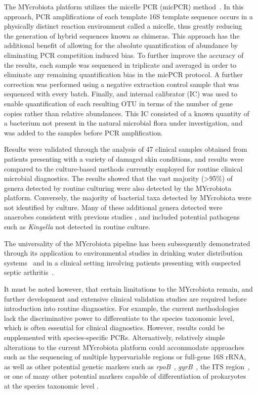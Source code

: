 The MYcrobiota platform utilizes the micelle PCR (micPCR) method~\cite{boers2015micelle,boers2017novel}. In this approach, PCR amplifications of each template 16S template sequence occurs in a physically distinct reaction environment called a micelle, thus greatly reducing the generation of hybrid sequences known as chimeras. This approach has the additional benefit of allowing for the absolute quantification of abundance by eliminating PCR competition induced bias. To further improve the accuracy of the results, each sample was sequenced in triplicate and averaged in order to eliminate any remaining quantification bias in the micPCR protocol. A further correction was performed using a negative extraction control sample that was sequenced with every batch. Finally, and internal calibrator (IC) was used to enable quantification of each resulting OTU in terms of the number of gene copies rather than relative abundances. This IC consisted of a known quantity of a bacterium not present in the natural microbial flora under investigation, and was added to the samples before PCR amplification.

Results were validated through the analysis of 47 clinical samples obtained from patients presenting with a variety of damaged skin conditions, and results were compared to the culture-based methods currently employed for routine clinical microbial diagnostics. The results showed that the vast majority (>95\%) of genera detected by routine culturing were also detected by the MYcrobiota platform. Conversely, the majority of bacterial taxa detected by MYcrobiota were not identified by culture. Many of these additional genera detected were anaerobes consistent with previous studies \cite{TODO}, and included potential pathogens such as \emph{Kingella} not detected in routine culture.

The universality of the MYcrobiota pipeline has been subsequently demonstrated through its application to environmental studies in drinking water distribution systems~\cite{boers2018monitoring} and in a clinical setting involving patients presenting with suspected septic arthritis~\cite{boers2018detection}.

It must be noted however, that certain limitations to the MYcrobiota remain, and further development and extensive clinical validation studies are required before introduction into routine diagnostics. For example, the current methodologies lack the discriminative power to differentiate to the species taxonomic level, which is often essential for clinical diagnostics. However, results could be supplemented with species-specific PCRs. Alternatively, relatively simple alterations to the current MYcrobiota platform could accommodate approaches such as the sequencing of multiple hypervariable regions or full-gene 16S rRNA, as well as other potential genetic markers such as \emph{rpoB}~\cite{adekambi2009rpob}, \emph{gyrB}~\cite{yamamoto1995pcr}, the ITS region~\cite{schoch2012nuclear}, or one of many other potential markers capable of differentiation of prokaryotes at the species taxonomic level \cite{lan2016marker,sabat2017targeted}.

